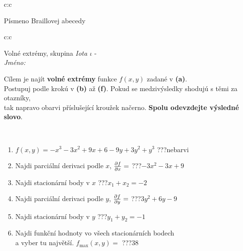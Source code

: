 \documentclass[10pt]{report}
\begin{document}
\begin{tabular}{c:c}
\begin{minipage}[c][104.5mm][t]{0.5\linewidth}
\begin{center}
\begin{minipage}{0.20\linewidth}
\begin{center}
{\small Písmeno Braillovej abecedy}
\end{center}
\end{minipage}
\end{center}
\end{minipage}
%
\end{tabular}
\newpage
\thispagestyle{empty}
\begin{tabular}{c:c}
\begin{minipage}[c][104.5mm][t]{0.5\linewidth}
\begin{center}
\vspace{7mm}
{\huge Volné extrémy, skupina \textit{Iota $\iota$} -}\\[5mm]
\textit{Jméno:}\phantom{xxxxxxxxxxxxxxxxxxxxxxxxxxxxxxxxxxxxxxxxxxxxxxxxxxxxxxxxxxxxxxxxx}\\[5mm]
\begin{minipage}{0.95\linewidth}
\begin{center}
Cílem je najít \textbf{volné extrémy} funkce $f(x,y)$ zadané v \textbf{(a)}.\\Postupuj podle krokú v \textbf{(b)} až \textbf{(f)}. Pokud se medzivýsledky shodujú s těmi za otazníky,\\tak napravo obarvi příslušející kroužek načerno. \textbf{Spolu odevzdejte výsledné slovo}.
\end{center}
\end{minipage}
\\[1mm]
\begin{minipage}{0.79\linewidth}
\begin{center}
\begin{varwidth}{\linewidth}
\begin{enumerate}
\normalsize
\item $f(x,y)=-x^3-3x^2+9x+6-9y+3y^2+y^3$\quad \dotfill\; ???\;\dotfill \quad nebarvi
\item Najdi parciální derivaci podle $x$, $\pdv{f}{x}=$\quad \dotfill\; ???\;\dotfill \quad $-3x^2-3x+9$
\item Najdi stacionární body v $x$\quad \dotfill\; ???\;\dotfill \quad $x_1+x_2=-2$
\item Najdi parciální derivaci podle $y$, $\pdv{f}{y}=$\quad \dotfill\; ???\;\dotfill \quad $3y^2+6y-9$
\item Najdi stacionární body v $y$\quad \dotfill\; ???\;\dotfill \quad $y_1+y_2=-1$
\item Najdi funkční hodnoty vo všech stacionárních bodech \\ \phantom{xxxxxx} a vyber tu najvětší. $f_{\text{max}}(x,y)=$\quad \dotfill\; ???\;\dotfill \quad $38$

\end{enumerate}
\end{varwidth}
\end{center}
\end{minipage}
\end{center}
\end{minipage}
\end{tabular}
\end{document}

